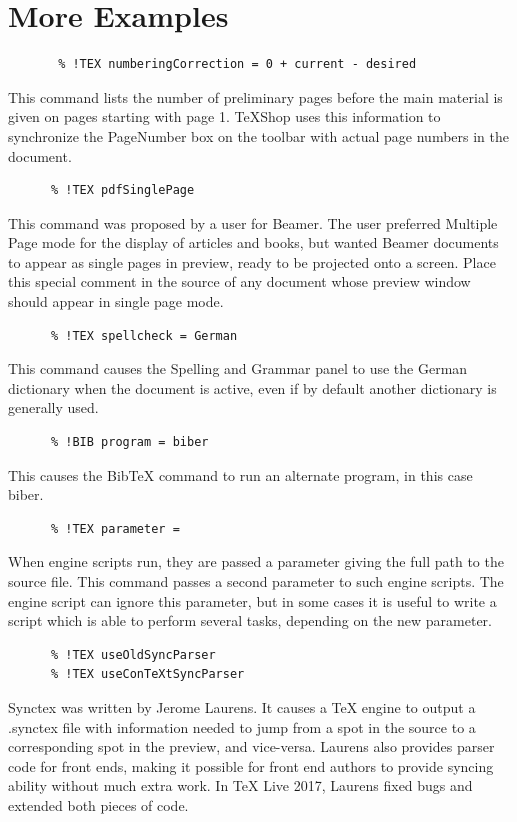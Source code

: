 \documentclass[11pt, oneside]{article}   	%
\begin{document}
 \newpage
 \section{More Examples}
 \begin{verbatim}
       % !TEX numberingCorrection = 0 + current - desired 
 \end{verbatim}
This command lists the number of preliminary pages before the main material is given on pages starting with page 1. 
TeXShop uses this information to synchronize the PageNumber box on the toolbar with actual page numbers in the document.

 \begin{verbatim}
      % !TEX pdfSinglePage
 \end{verbatim}
 This command was proposed by a user for  Beamer. The user preferred Multiple Page mode for the  display of articles and books, but wanted Beamer documents to appear as single pages in preview, ready to be projected onto a screen. Place this special comment in the source of any document whose preview window should appear in single page mode.
 
  \begin{verbatim}
      % !TEX spellcheck = German
 \end{verbatim}
 This command causes the Spelling and Grammar panel to use the German dictionary when the document is active, even if by default another dictionary is generally used.
 
  \begin{verbatim}
      % !BIB program = biber
 \end{verbatim}
 This causes the BibTeX command to run an alternate program, in this case biber.    
  
  \begin{verbatim}
      % !TEX parameter = 
 \end{verbatim}
When engine scripts run, they are passed a parameter giving the full path to the source file. This command passes a second parameter to such engine scripts. The engine script can ignore this parameter, but in some cases it is useful to write a script which is able to perform several tasks, depending on the new parameter.  
     
  \begin{verbatim}
      % !TEX useOldSyncParser
      % !TEX useConTeXtSyncParser
 \end{verbatim}
Synctex was written by Jerome Laurens. It causes a TeX engine to output a .synctex file with information needed to jump from a spot in the source to a corresponding spot in the preview, and vice-versa. Laurens also provides parser code for front ends, making it possible for front end authors to provide syncing ability without much extra work. In TeX Live 2017, Laurens fixed bugs and extended both pieces of code.
\end{document}
